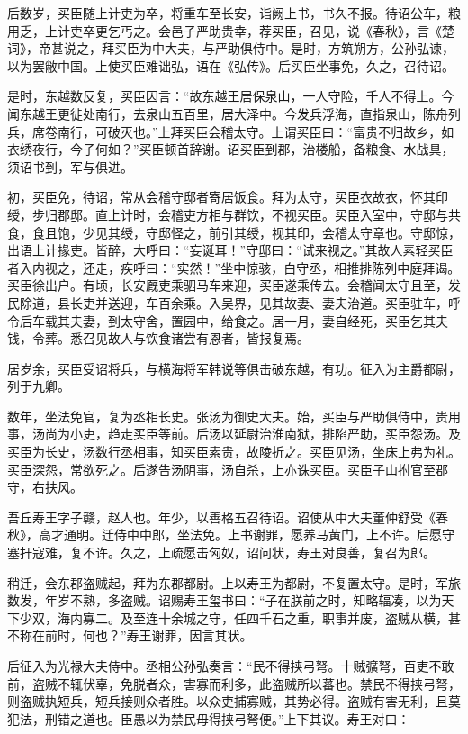 \documentclass[]{article}
\begin{document}
后数岁，买臣随上计吏为卒，将重车至长安，诣阙上书，书久不报。待诏公车，粮用乏，上计吏卒更乞丐之。会邑子严助贵幸，荐买臣，召见，说《春秋》，言《楚词》，帝甚说之，拜买臣为中大夫，与严助俱侍中。是时，方筑朔方，公孙弘谏，以为罢敝中国。上使买臣难诎弘，语在《弘传》。后买臣坐事免，久之，召待诏。

是时，东越数反复，买臣因言：``故东越王居保泉山，一人守险，千人不得上。今闻东越王更徙处南行，去泉山五百里，居大泽中。今发兵浮海，直指泉山，陈舟列兵，席卷南行，可破灭也。''上拜买臣会稽太守。上谓买臣曰：``富贵不归故乡，如衣绣夜行，今子何如？''买臣顿首辞谢。诏买臣到郡，治楼船，备粮食、水战具，须诏书到，军与俱进。

初，买臣免，待诏，常从会稽守邸者寄居饭食。拜为太守，买臣衣故衣，怀其印绶，步归郡邸。直上计时，会稽吏方相与群饮，不视买臣。买臣入室中，守邸与共食，食且饱，少见其绶，守邸怪之，前引其绶，视其印，会稽太守章也。守邸惊，出语上计掾吏。皆醉，大呼曰：``妄诞耳！''守邸曰：``试来视之。''其故人素轻买臣者入内视之，还走，疾呼曰：``实然！''坐中惊骇，白守丞，相推排陈列中庭拜谒。买臣徐出户。有顷，长安厩吏乘驷马车来迎，买臣遂乘传去。会稽闻太守且至，发民除道，县长吏并送迎，车百余乘。入吴界，见其故妻、妻夫治道。买臣驻车，呼令后车载其夫妻，到太守舍，置园中，给食之。居一月，妻自经死，买臣乞其夫钱，令葬。悉召见故人与饮食诸尝有恩者，皆报复焉。

居岁余，买臣受诏将兵，与横海将军韩说等俱击破东越，有功。征入为主爵都尉，列于九卿。

数年，坐法免官，复为丞相长史。张汤为御史大夫。始，买臣与严助俱侍中，贵用事，汤尚为小吏，趋走买臣等前。后汤以延尉治淮南狱，排陷严助，买臣怨汤。及买臣为长史，汤数行丞相事，知买臣素贵，故陵折之。买臣见汤，坐床上弗为礼。买臣深怨，常欲死之。后遂告汤阴事，汤自杀，上亦诛买臣。买臣子山拊官至郡守，右扶风。

吾丘寿王字子赣，赵人也。年少，以善格五召待诏。诏使从中大夫董仲舒受《春秋》，高才通明。迁侍中中郎，坐法免。上书谢罪，愿养马黄门，上不许。后愿守塞扞寇难，复不许。久之，上疏愿击匈奴，诏问状，寿王对良善，复召为郎。

稍迁，会东郡盗贼起，拜为东郡都尉。上以寿王为都尉，不复置太守。是时，军旅数发，年岁不熟，多盗贼。诏赐寿王玺书曰：``子在朕前之时，知略辐凑，以为天下少双，海内寡二。及至连十余城之守，任四千石之重，职事并废，盗贼从横，甚不称在前时，何也？''寿王谢罪，因言其状。

后征入为光禄大夫侍中。丞相公孙弘奏言：``民不得挟弓弩。十贼彍弩，百吏不敢前，盗贼不辄伏辜，免脱者众，害寡而利多，此盗贼所以蕃也。禁民不得挟弓弩，则盗贼执短兵，短兵接则众者胜。以众吏捕寡贼，其势必得。盗贼有害无利，且莫犯法，刑错之道也。臣愚以为禁民毋得挟弓弩便。''上下其议。寿王对曰：
\end{document}
